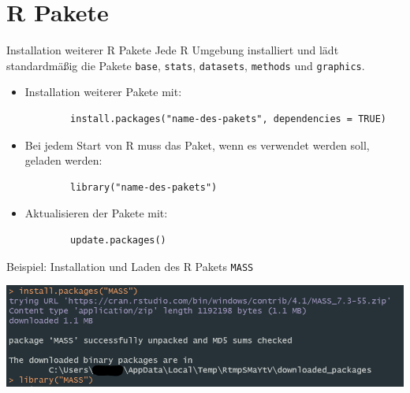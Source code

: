 \documentclass[aspectratio = 169]{chariteBeamer}
\begin{document}

	


\section{\textsf R Pakete}


\begin{frame}[fragile]{Installation weiterer \textsf R Pakete}
    Jede \textsf R Umgebung installiert und lädt standardmäßig die Pakete \texttt{base}, \texttt{stats}, \texttt{datasets}, \texttt{methods} und \texttt{graphics}.\bigskip
    \begin{itemize}
        \item Installation weiterer Pakete mit:
        \begin{verbatim}
        install.packages("name-des-pakets", dependencies = TRUE)
        \end{verbatim}
        \item Bei jedem Start von \textsf R muss das Paket, wenn es verwendet werden soll, geladen werden:
        \begin{verbatim}
        library("name-des-pakets")
        \end{verbatim}
        \item Aktualisieren der Pakete mit:
        \begin{verbatim}
        update.packages()
        \end{verbatim}
    \end{itemize}
\end{frame}

\begin{frame}[fragile]{Beispiel: Installation und Laden des \textsf R Pakets \texttt{MASS}}
    \begin{center}
        \includegraphics[width=\textwidth, keepaspectratio]{pakete.png}
    \end{center}
\end{frame}
\end{document}

